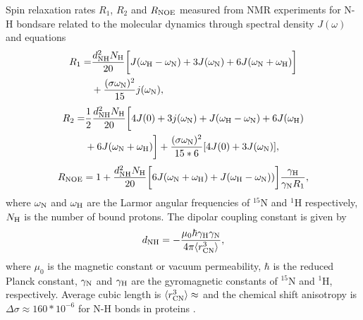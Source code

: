 \documentclass[pre,aps,floatfix,authordate1-4,twocolumn]{revtex4-1}
\begin{document}
Spin relaxation rates $R_1$, $R_2$ and $R_{\rm NOE}$ measured from NMR experiments
for N-H bondsare related to the molecular dynamics through spectral density $J(\omega)$ and equations \cite{abragam,kay89}
\begin{equation}\label{R1}
  \begin{aligned}
  R_{1}= & \frac{d_{\rm{NH}}^2N_{\rm{H}}}{20}\bigg[J(\omega_{\rm{H}}-\omega_{\rm{N}})+3J(\omega_{\rm{N}})+6J(\omega_{\rm{N}}+\omega_{\rm{H}})\bigg] \\
        & +\frac{(\sigma \omega_{\rm{N}})^2}{15}j(\omega_{\rm{N}}),
  \end{aligned}
\end{equation}
\begin{equation}\label{R2}
    \begin{aligned}
  R_{2}= & \frac{1}{2}\frac{d_{\rm{NH}}^2N_{\rm{H}}}{20}\bigg[4J(0)+3j(\omega_{\rm{N}})+J(\omega_{\rm{H}}-\omega_{\rm{N}})+6J(\omega_{\rm{H}})  \\
    & +6J(\omega_{\rm{N}}+\omega_{\rm{H}})\bigg]+\frac{(\sigma \omega_{\rm{N}})^2}{15*6}[4J(0) +3J(\omega_{\rm{N}})],
    \end{aligned}
\end{equation}
\begin{equation}\label{NOE}
R_{\rm NOE}=1+\frac{d_{\rm{NH}}^2N_{\rm{H}}}{20}\bigg[6J(\omega_{\rm{N}}+\omega_{\rm{H}})+J(\omega_{\rm{H}}-\omega_{\rm{N}}))\bigg]\frac{\gamma_{\rm{H}}}{\gamma_{\rm{N}}R_1},
\end{equation}
where $\omega_{\rm{N}}$ and $\omega_{\rm{H}}$ are the Larmor angular frequencies of $^{15}$N and $^1$H respectively,
$N_{\rm{H}}$ is the number of bound protons. The dipolar coupling constant is given by
\begin{equation}
d_{\rm{NH}}=-\frac{\mu_0\hbar\gamma_{\rm{H}}\gamma_{\rm{N}}}{4\pi\langle r_{\rm{CN}}^3\rangle},\nonumber
\end{equation}
where $\mu_0$ is the magnetic constant or vacuum permeability, $\hbar$ is the reduced Planck constant,
$\gamma_{\rm{N}}$ and $\gamma_{\rm{H}}$ are the gyromagnetic constants of $^{15}$N and $^1$H, respectively.
Average cubic length is $\langle r_{\rm{CN}}^3\rangle \approx$ and the 
chemical shift anisotropy is $\Delta \sigma \approx 160*10^{-6}$ for N-H bonds in proteins \cite{??}.
\end{document}
